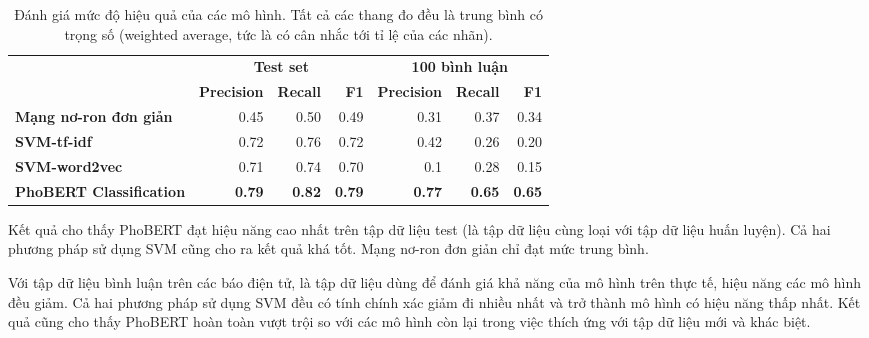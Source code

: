 \begin{table}[ht!]
    \centering
\begin{tabular}{l|rrr|rrr|}
\cline{2-7}
                                                      & \multicolumn{3}{c|}{\textbf{Test set}}                                                         & \multicolumn{3}{c|}{\textbf{100 bình luận}}                                                    \\ \cline{2-7} 
                                                      & \multicolumn{1}{r|}{\textbf{Precision}} & \multicolumn{1}{r|}{\textbf{Recall}} & \textbf{F1}   & \multicolumn{1}{r|}{\textbf{Precision}} & \multicolumn{1}{r|}{\textbf{Recall}} & \textbf{F1}   \\ \hline
\multicolumn{1}{|l|}{\textbf{Mạng nơ-ron đơn giản}}   & \multicolumn{1}{r|}{0.45}               & \multicolumn{1}{r|}{0.50}            & 0.49          & \multicolumn{1}{r|}{0.31}               & \multicolumn{1}{r|}{0.37}            & 0.34          \\ \hline
\multicolumn{1}{|l|}{\textbf{SVM-tf-idf}}             & \multicolumn{1}{r|}{0.72}               & \multicolumn{1}{r|}{0.76}            & 0.72          & \multicolumn{1}{r|}{0.42}               & \multicolumn{1}{r|}{0.26}            & 0.20          \\ \hline
\multicolumn{1}{|l|}{\textbf{SVM-word2vec}}           & \multicolumn{1}{r|}{0.71}               & \multicolumn{1}{r|}{0.74}            & 0.70          & \multicolumn{1}{r|}{0.1}                & \multicolumn{1}{r|}{0.28}            & 0.15          \\ \hline
\multicolumn{1}{|l|}{\textbf{PhoBERT Classification}} & \multicolumn{1}{r|}{\textbf{0.79}}      & \multicolumn{1}{r|}{\textbf{0.82}}   & \textbf{0.79} & \multicolumn{1}{r|}{\textbf{0.77}}      & \multicolumn{1}{r|}{\textbf{0.65}}   & \textbf{0.65} \\ \hline
\end{tabular}
    \caption{Đánh giá mức độ hiệu quả của các mô hình. Tất cả các thang đo đều là trung bình có trọng số (weighted average, tức là có cân nhắc tới tỉ lệ của các nhãn).}
    \label{table:sentiment-models-evaluation}
\end{table}

Kết quả cho thấy PhoBERT đạt hiệu năng cao nhất trên tập dữ liệu test (là tập dữ liệu cùng loại với tập dữ liệu huấn luyện). Cả hai phương pháp sử dụng SVM cũng cho ra kết quả khá tốt. Mạng nơ-ron đơn giản chỉ đạt mức trung bình.

Với tập dữ liệu bình luận trên các báo điện tử, là tập dữ liệu dùng để đánh giá khả năng của mô hình trên thực tế, hiệu năng các mô hình đều giảm. Cả hai phương pháp sử dụng SVM đều có tính chính xác giảm đi nhiều nhất và trở thành mô hình có hiệu năng thấp nhất. Kết quả cũng cho thấy PhoBERT hoàn toàn vượt trội so với các mô hình còn lại trong việc thích ứng với tập dữ liệu mới và khác biệt.


